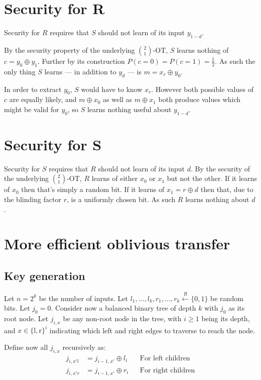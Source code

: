 \documentclass[a4paper]{scrreprt}
\begin{document}
\section{Security for R}

Security for $R$ requires that $S$ should not learn of its input $y_{1-d}$.

By the security property of the underlying $\binom{2}{1}$-OT, $S$ learns
nothing of $c = y_0 \oplus y_1$. Further by its construction $P(c = 0) = P(c =
1) = \frac{1}{2}$. As such the only thing $S$ learns --- in addition to $y_d$
--- is $m = x_c \oplus y_0$.

In order to extract $y_0$, $S$ would have to know $x_c$. However both possible
values of $c$ are equally likely, and $m \oplus x_0$ as well as $m \oplus x_1$
both produce values which might be valid for $y_0$, so $S$ learns nothing
useful about $y_{1-d}$.

\section{Security for S}

Security for $S$ requires that $R$ should not learn of its input $d$. By the
security of the underlying $\binom{2}{1}$-OT, $R$ learns of either $x_0$ or
$x_1$ but not the other. If it learns of $x_0$ then that's simply a random bit.
If it learns of $x_1 = r \oplus d$ then that, due to the blinding factor $r$,
is a uniformly chosen bit. As such $R$ learns nothing about $d$.


\section{More efficient oblivious transfer}

\subsection{Key generation}

Let $n = 2^k$ be the number of inputs. Let $l_1, \ldots, l_k, r_1, \ldots, r_k
\xleftarrow{R} \{0, 1\}$ be random bits. Let $j_0 = 0$. Consider now a balanced
binary tree of depth $k$ with $j_0$ as its root node. Let $j_{i, x}$ be any
non-root node in the tree, with $i \geq 1$ being its depth, and $x \in \{\text{l},
\text{r}\}^i$ indicating which left and right edges to traverse to reach the node.

Define now all $j_{i, x}$ recursively as:
\begin{align*}
		j_{i, x'l} & = j_{i - 1, x'} \oplus l_i && \text{For left children} \\
		j_{i, x'r} & = j_{i - 1, x'} \oplus r_i && \text{For right children}
\end{align*}
\end{document}
